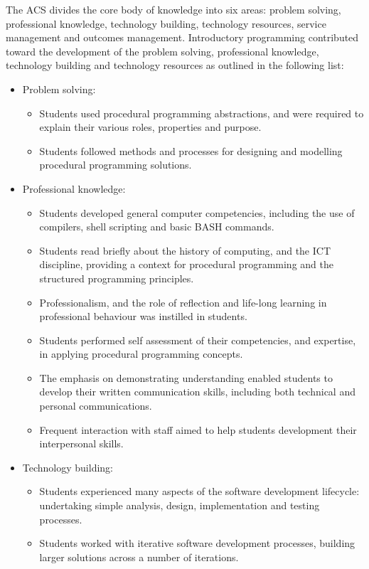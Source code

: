 The ACS divides the core body of knowledge into six areas: problem solving, professional knowledge, technology building, technology resources, service management and outcomes management. Introductory programming contributed toward the development of the problem solving, professional knowledge, technology building and technology resources as outlined in the following list:
\begin{itemize}[noitemsep,nolistsep]
	\item Problem solving:
	\begin{itemize}[noitemsep,nolistsep]
		\item Students used procedural programming abstractions, and were required to explain their various roles, properties and purpose. 
		\item Students followed methods and processes for designing and modelling procedural programming solutions.
	\end{itemize}
	\item Professional knowledge:
	\begin{itemize}[noitemsep,nolistsep]
		\item Students developed general computer competencies, including the use of compilers, shell scripting and basic BASH commands.
		\item Students read briefly about the history of computing, and the ICT discipline, providing a context for procedural programming and the structured programming principles.
		\item Professionalism, and the role of reflection and life-long learning in professional behaviour was instilled in students.
		\item Students performed self assessment of their competencies, and expertise, in applying procedural programming concepts. 
		\item The emphasis on demonstrating understanding enabled students to develop their written communication skills, including both technical and personal communications.
		\item Frequent interaction with staff aimed to help students development their interpersonal skills.
	\end{itemize}
	\item Technology building:
	\begin{itemize}[noitemsep,nolistsep]
		\item Students experienced many aspects of the software development lifecycle: undertaking simple analysis, design, implementation and testing processes.
		\item Students worked with iterative software development processes, building larger solutions across a number of iterations.

\end{itemize}
\end{itemize}
